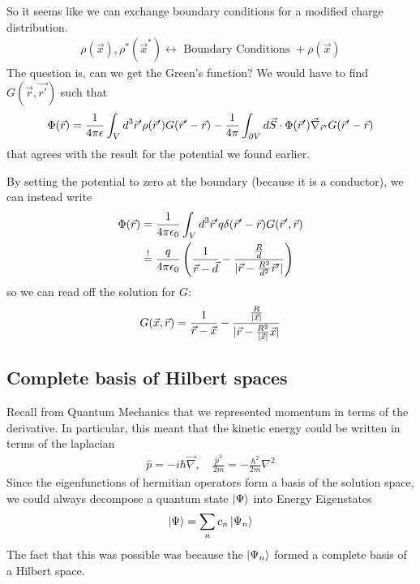 So it seems like we can exchange boundary conditions for a modified charge distribution.
\begin{align*}
  \rho(\vec{x}), \rho^{\ast}(\vec{x}^{\ast}) \longleftrightarrow \text{ Boundary Conditions } + \rho(\vec{x})
\end{align*}
The question is, can we get the Green's function? 
We would have to find $G(\vec{r},\vec{r'})$ such that
\begin{align*}
  \Phi(\vec{r}) = \frac{1}{4 \pi \epsilon}
  \int_{V}d^{3}\vec{r}' \rho(\vec{r}') G(\vec{r}' - \vec{r})
  -
  \frac{1}{4 \pi} \int_{\partial V}d \vec{S} \cdot \Phi(\vec{r}') \vec{\nabla}_{\vec{r}'} G(\vec{r}'-\vec{r})
\end{align*}
that agrees with the result for the potential we found earlier.

By setting the potential to zero at the boundary (because it is a conductor), we can instead write
\begin{align*}
  \Phi(\vec{r}) &= 
  \frac{1}{4 \pi \epsilon_0} \int_{V}d^{3}\vec{r}' q \delta(\vec{r}' - \vec{r})G(\vec{r}',\vec{r})\\
                &\stackrel{!}{=} \frac{q}{4 \pi \epsilon_0} \left(
                \frac{1}{\vec{r} - \vec{d}} - \frac{\frac{R}{d}}{\vert\vec{r} - \frac{R^{2}}{d^{2}}\vec{r}'\vert}
                \right)
\end{align*}
so we can read off the solution for $G$:
\begin{align*}
  G(\vec{x},\vec{r}) 
  = 
  \frac{1}{\vec{r} - \vec{x}} - \frac{\frac{R}{\vert\vec{x}\vert}}{\vert\vec{r} - \frac{R^{2}}{\vert\vec{x}\vert} \vec{x}\vert}
\end{align*}


\subsection{Complete basis of Hilbert spaces}

Recall from Quantum Mechanics that we represented momentum in terms of the derivative. 
In particular, this meant that the kinetic energy could be written in terms of the laplacian
\begin{align*}
  \hat{p} = - i \hbar \vec{\nabla}, \quad \frac{\hat{p}^{2}}{2m} = -\frac{\hbar^{2}}{2m} \nabla^{2}
\end{align*}
Since the eigenfunctions of hermitian operators form a basis of the solution space, we could always decompose a quantum state $\ket{\Psi}$ into Energy Eigenstates
\begin{align*}
  \ket{\Psi} = \sum_{n} c_n \ket{\Psi_n}
\end{align*}
The fact that this was possible was because the $\ket{\Psi_n}$ formed a complete basis of a Hilbert space.

